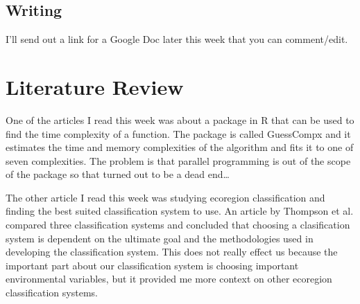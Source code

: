 \documentclass[a4paper,10pt]{article}
\begin{document}
\subsection{Writing}
I'll send out a link for a Google Doc later this week that you can comment/edit.

\section{Literature Review}
One of the articles I read this week \cite{agenis2021an} was about a package in R that can be used to find the time complexity of a function. The package is called GuessCompx and it estimates the time and memory complexities of the algorithm and fits it to one of seven complexities. The problem is that parallel programming is out of the scope of the package so that turned out to be a dead end\dots

The other article I read this week \cite{thompson2004topographic} was studying ecoregion classification and finding the best suited classification system to use. An article by Thompson et al. compared three classification systems and concluded that choosing a clasification system is dependent on the ultimate goal and the methodologies used in developing the classification system. This does not really effect us because the important part about our classification system is choosing important environmental variables, but it provided me more context on other ecoregion classification systems.



\end{document}
